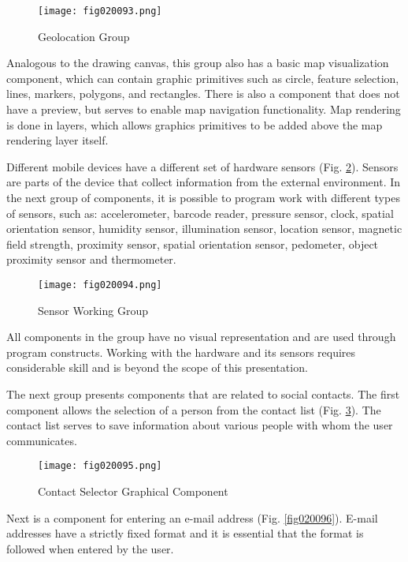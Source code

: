 \begin{figure}[H]
   \centering
   \texttt{[image: fig020093.png]}
   \caption{Geolocation Group}
\label{fig020093}
\end{figure}

Analogous to the drawing canvas, this group also has a basic map visualization component, which can contain graphic primitives such as circle, feature selection, lines, markers, polygons, and rectangles. There is also a component that does not have a preview, but serves to enable map navigation functionality. Map rendering is done in layers, which allows graphics primitives to be added above the map rendering layer itself.

Different mobile devices have a different set of hardware sensors (Fig. \ref{fig020094}). Sensors are parts of the device that collect information from the external environment. In the next group of components, it is possible to program work with different types of sensors, such as: accelerometer, barcode reader, pressure sensor, clock, spatial orientation sensor, humidity sensor, illumination sensor, location sensor, magnetic field strength, proximity sensor, spatial orientation sensor, pedometer, object proximity sensor and thermometer.

\begin{figure}[H]
   \centering
   \texttt{[image: fig020094.png]}
   \caption{Sensor Working Group}
\label{fig020094}
\end{figure}

All components in the group have no visual representation and are used through program constructs. Working with the hardware and its sensors requires considerable skill and is beyond the scope of this presentation.

The next group presents components that are related to social contacts. The first component allows the selection of a person from the contact list (Fig. \ref{fig020095}). The contact list serves to save information about various people with whom the user communicates.

\begin{figure}[H]
   \centering
   \texttt{[image: fig020095.png]}
   \caption{Contact Selector Graphical Component}
\label{fig020095}
\end{figure}

Next is a component for entering an e-mail address (Fig. \ref{fig020096}). E-mail addresses have a strictly fixed format and it is essential that the format is followed when entered by the user.

